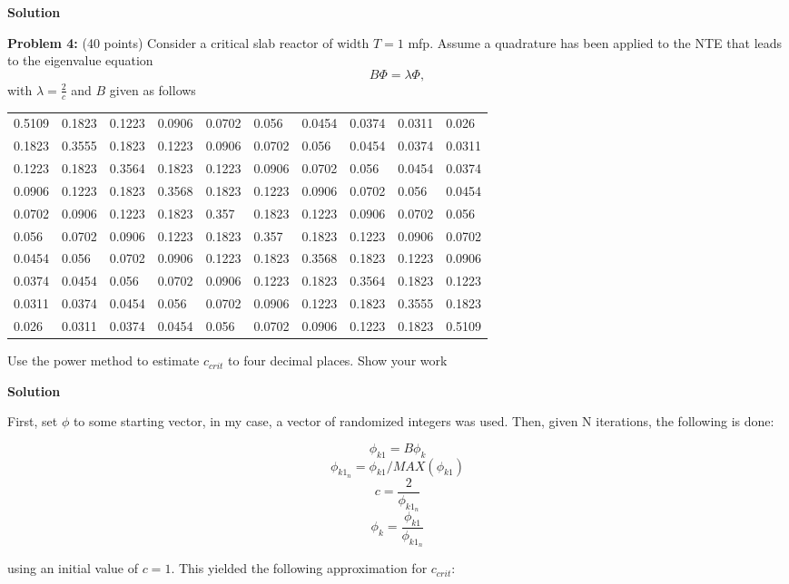 \documentclass{amsart}
\theoremstyle{definition}
\begin{document}
\textbf{Solution}



\newpage
\textbf{Problem 4:} (40 points) Consider a critical slab reactor of width $T=1$ mfp. Assume a quadrature has been applied to the NTE that leads to the eigenvalue equation
\begin{equation*}
    B\Phi = \lambda \Phi,
\end{equation*}
with $\lambda = \frac{2}{c}$ and $B$ given as follows \newline
\begin{table}[h!]
\begin{tabular}{llllllllll}
0.5109 & 0.1823 & 0.1223 & 0.0906 & 0.0702 & 0.056  & 0.0454 & 0.0374 & 0.0311 & 0.026  \\
0.1823 & 0.3555 & 0.1823 & 0.1223 & 0.0906 & 0.0702 & 0.056  & 0.0454 & 0.0374 & 0.0311 \\
0.1223 & 0.1823 & 0.3564 & 0.1823 & 0.1223 & 0.0906 & 0.0702 & 0.056  & 0.0454 & 0.0374 \\
0.0906 & 0.1223 & 0.1823 & 0.3568 & 0.1823 & 0.1223 & 0.0906 & 0.0702 & 0.056  & 0.0454 \\
0.0702 & 0.0906 & 0.1223 & 0.1823 & 0.357  & 0.1823 & 0.1223 & 0.0906 & 0.0702 & 0.056  \\
0.056  & 0.0702 & 0.0906 & 0.1223 & 0.1823 & 0.357  & 0.1823 & 0.1223 & 0.0906 & 0.0702 \\
0.0454 & 0.056  & 0.0702 & 0.0906 & 0.1223 & 0.1823 & 0.3568 & 0.1823 & 0.1223 & 0.0906 \\
0.0374 & 0.0454 & 0.056  & 0.0702 & 0.0906 & 0.1223 & 0.1823 & 0.3564 & 0.1823 & 0.1223 \\
0.0311 & 0.0374 & 0.0454 & 0.056  & 0.0702 & 0.0906 & 0.1223 & 0.1823 & 0.3555 & 0.1823 \\
0.026  & 0.0311 & 0.0374 & 0.0454 & 0.056  & 0.0702 & 0.0906 & 0.1223 & 0.1823 & 0.5109
\end{tabular}
\end{table}
 
Use the power method to estimate $c_{crit}$ to four decimal places. Show your work
 
\textbf{Solution}

First, set $\phi$ to some starting vector, in my case, a vector of randomized integers was used.
Then, given N iterations, the following is done:

$$ \phi_{k1} = B \phi_k $$
$$ \phi_{k1_n} = \phi_{k1} / MAX(\phi_{k1}) $$
$$ c = \frac{2}{\phi_{k1_n}} $$
$$ \phi_k = \frac{\phi_{k1}}{\phi_{k1_n}} $$

using an initial value of $c=1$.
This yielded the following approximation for $c_{crit}$:


 
 
 
\end{document}

